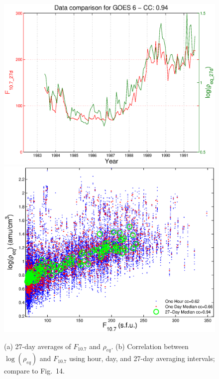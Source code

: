 \documentclass[10pt,twocolumn]{article}
\begin{document}
\begin{figure}[htp!]
\centering
\includegraphics[scale=0.40]{paperfigures/F107MD27d-GOES6.eps}
\includegraphics[scale=0.40]{paperfigures/ccplot.eps}
\caption{(a) 27-day averages of $F_{10.7}$ and $\rho_{eq}$. (b) Correlation between $\log(\rho_{eq})$ and $F_{10.7}$ using hour, day, and 27-day averaging intervals; compare to \cite{Takahashi2010} Fig.~14.}
\label{ccplot}
\end{figure}
\clearpage
\end{document}

